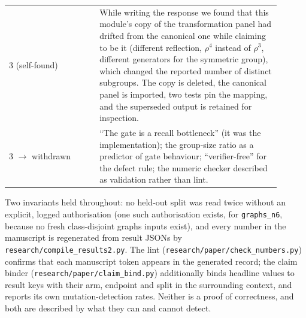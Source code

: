 \documentclass[11pt]{article}
\begin{document}
\begin{table}[t]
\begin{tabular}{@{}p{0.30\linewidth}p{0.60\linewidth}@{}}
3 (self-found) & While writing the response we found that this module's copy of the
transformation panel had drifted from the canonical one while claiming to be it (different
reflection, $\rho^4$ instead of $\rho^3$, different generators for the symmetric group), which
changed the reported number of distinct subgroups. The copy is deleted, the canonical panel is
imported, two tests pin the mapping, and the superseded output is retained for inspection. \\
3 $\to$ withdrawn & ``The gate is a recall bottleneck'' (it was the implementation); the
group-size ratio as a predictor of gate behaviour; ``verifier-free'' for the defect rule; the
numeric checker described as validation rather than lint. \\
\bottomrule
\end{tabular}
\end{table}

Two invariants held throughout: no held-out split was read twice without an explicit,
logged authorisation (one such authorisation exists, for \texttt{graphs\_n6}, because no fresh
class-disjoint graphs inputs exist), and every number in the manuscript is regenerated from
result JSONs by \texttt{research/compile\_results2.py}. The lint
(\texttt{research/paper/check\_numbers.py}) confirms that each manuscript token appears in the
generated record; the claim binder (\texttt{research/paper/claim\_bind.py}) additionally binds
headline values to result keys with their arm, endpoint and split in the surrounding context,
and reports its own mutation-detection rates. Neither is a proof of correctness, and both are
described by what they can and cannot detect.
\end{document}
